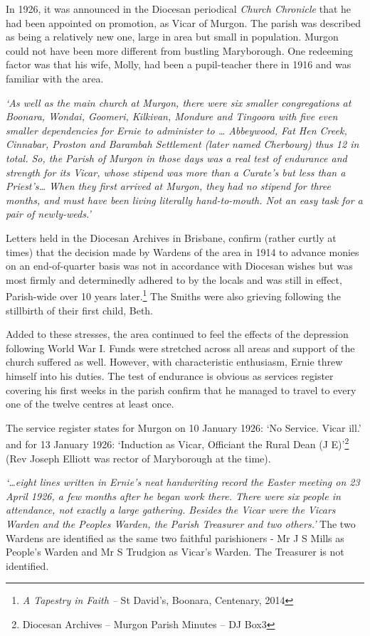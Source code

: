 In 1926, it was announced in the Diocesan periodical \emph{Church Chronicle} that he had been appointed on promotion, as Vicar of Murgon. The parish was described as being a relatively new one, large in area but small in population. Murgon could not have been more different from bustling Maryborough. One redeeming factor was that his wife, Molly, had been a pupil-teacher there in 1916 and was familiar with the area.

\emph{`As well as the main church at Murgon, there were six smaller congregations at Boonara, Wondai, Goomeri, Kilkivan, Mondure and Tingoora with five even smaller dependencies for Ernie to administer to \ldots{} Abbeywood, Fat Hen Creek, Cinnabar, Proston and Barambah Settlement (later named Cherbourg) thus 12 in total. So, the Parish of Murgon in those days was a real test of endurance and strength for its Vicar, whose stipend was more than a Curate's but less than a Priest's\ldots{} When they first arrived at Murgon, they had no stipend for three months, and must have been living literally hand-to-mouth. Not an easy task for a pair of newly-weds.'}

Letters held in the Diocesan Archives in Brisbane, confirm (rather curtly at times) that the decision made by Wardens of the area in 1914 to advance monies on an end-of-quarter basis was not in accordance with Diocesan wishes but was most firmly and determinedly adhered to by the locals and was still in effect, Parish-wide over 10 years later.\footnote{\emph{A Tapestry in Faith --} St David's, Boonara, Centenary, 2014} The Smiths were also grieving following the stillbirth of their first child, Beth.

Added to these stresses, the area continued to feel the effects of the depression following World War I. Funds were stretched across all areas and support of the church suffered as well. However, with characteristic enthusiasm, Ernie threw himself into his duties. The test of endurance is obvious as services register covering his first weeks in the parish confirm that he managed to travel to every one of the twelve centres at least once.

The service register states for Murgon on 10 January 1926: `No Service. Vicar ill.' and for 13 January 1926: `Induction as Vicar, Officiant the Rural Dean (J E)'\footnote{Diocesan Archives -- Murgon Parish Minutes -- DJ Box3} (Rev Joseph Elliott was rector of Maryborough at the time).

\emph{`\ldots eight lines written in Ernie's neat handwriting record the Easter meeting on 23 April 1926, a few months after he began work there. There were six people in attendance, not exactly a large gathering. Besides the Vicar were the Vicars Warden and the Peoples Warden, the Parish Treasurer and two others.'} The two Wardens are identified as the same two faithful parishioners - Mr J S Mills as People's Warden and Mr S Trudgion as Vicar's Warden. The Treasurer is not identified.

